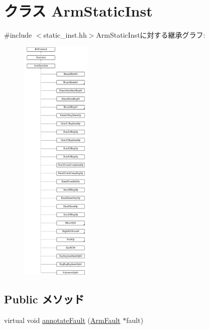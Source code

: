 \hypertarget{classArmISA_1_1ArmStaticInst}{
\section{クラス ArmStaticInst}
\label{classArmISA_1_1ArmStaticInst}
}


{\ttfamily \#include $<$static\_\-inst.hh$>$}ArmStaticInstに対する継承グラフ:\begin{figure}[H]
\begin{center}
\leavevmode
\includegraphics[height=12cm]{classArmISA_1_1ArmStaticInst}
\end{center}
\end{figure}
\subsection*{Public メソッド}
\begin{DoxyCompactItemize}
\item 
virtual void \hyperlink{classArmISA_1_1ArmStaticInst_afdc526dcb5bdd123d904d20430a4e4eb}{annotateFault} (\hyperlink{classArmISA_1_1ArmFault}{ArmFault} $\ast$fault)
\end{DoxyCompactItemize}
